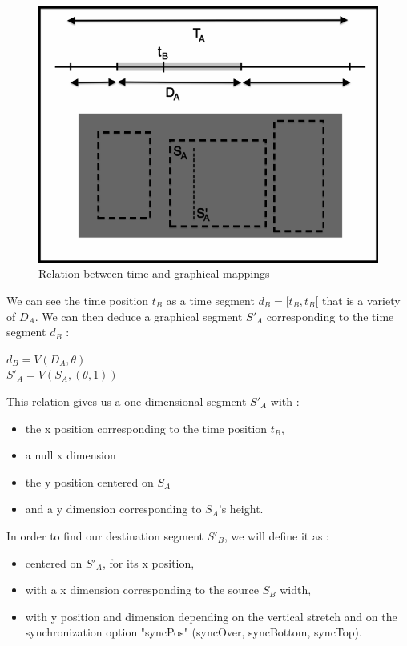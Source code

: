 \documentclass[a4paper]{article}
\begin{document}
\begin{figure}[h]
\begin{center}
\includegraphics[width=12cm]{img/time_graphic3.png}
\caption{Relation between time and graphical mappings}
\label{fig:time2graphic}
\end{center}
\end{figure}

We can see the time position $t_B$ as a time segment $d_B = [t_B, t_B[$ that is a variety of $D_A$. We can then deduce a graphical segment $S'_A$ corresponding to the time segment $d_B$ :

\begin{center}
$d_B = V(D_A, \theta)$\\
$S'_A = V(S_A, (\theta, 1))$
\end{center}

This relation gives us a one-dimensional segment $S'_A$ with :
\begin{itemize}
  \item the x position corresponding to the time position $t_B$, 
  \item a null x dimension
  \item the y position centered on $S_A$
  \item and a y dimension corresponding to $S_A$'s height.
\end{itemize} 


In order to find our destination segment $S'_B$, we will define it as :
\begin{itemize}
  \item centered on $S'_A$, for its x position,
  \item with a x dimension corresponding to the source $S_B$ width,
  \item with y position and dimension depending on the vertical stretch and on the synchronization option "syncPos" (syncOver, syncBottom, syncTop).
\end{itemize}
\end{document}
